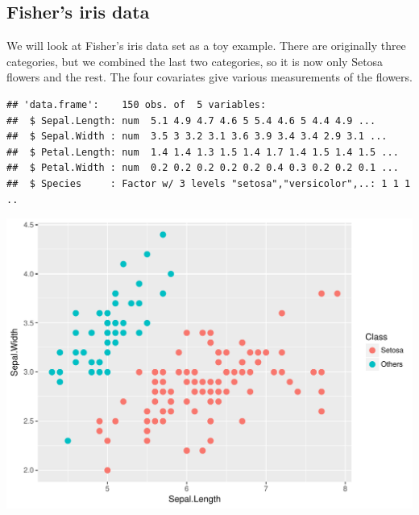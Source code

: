 \documentclass[class=article, crop=false]{standalone}\usepackage[]{graphicx}\usepackage[]{color}
\makeatletter
\def\maxwidth{ %
  \ifdim\Gin@nat@width>\linewidth
    \linewidth
  \else
    \Gin@nat@width
  \fi
}
\newenvironment{kframe}{%
 \def\at@end@of@kframe{}%
 \ifinner\ifhmode%
  \def\at@end@of@kframe{\end{minipage}}%
  \begin{minipage}{\columnwidth}%
 \fi\fi%
 \def\FrameCommand##1{\hskip\@totalleftmargin \hskip-\fboxsep
 \colorbox{shadecolor}{##1}\hskip-\fboxsep
     \hskip-\linewidth \hskip-\@totalleftmargin \hskip\columnwidth}%
 \MakeFramed {\advance\hsize-\width
   \@totalleftmargin\z@ \linewidth\hsize
   \@setminipage}}%
 {\par\unskip\endMakeFramed%
 \at@end@of@kframe}
\newenvironment{knitrout}{}{} %
\makeatother
\begin{document}
\subsection{Fisher's iris data}

We will look at Fisher's iris data set as a toy example. There are originally three categories, but we combined the last two categories, so it is now only Setosa flowers and the rest. The four covariates give various measurements of the flowers.

\begin{knitrout}
\color{fgcolor}\begin{kframe}
\begin{verbatim}
## 'data.frame':	150 obs. of  5 variables:
##  $ Sepal.Length: num  5.1 4.9 4.7 4.6 5 5.4 4.6 5 4.4 4.9 ...
##  $ Sepal.Width : num  3.5 3 3.2 3.1 3.6 3.9 3.4 3.4 2.9 3.1 ...
##  $ Petal.Length: num  1.4 1.4 1.3 1.5 1.4 1.7 1.4 1.5 1.4 1.5 ...
##  $ Petal.Width : num  0.2 0.2 0.2 0.2 0.2 0.4 0.3 0.2 0.2 0.1 ...
##  $ Species     : Factor w/ 3 levels "setosa","versicolor",..: 1 1 1 ..
\end{verbatim}
\end{kframe}
\end{knitrout}
\begin{knitrout}
\color{fgcolor}

{\centering \includegraphics[width=\maxwidth]{figure/iris_plot1-1} 

}



\end{knitrout}
\end{document}
